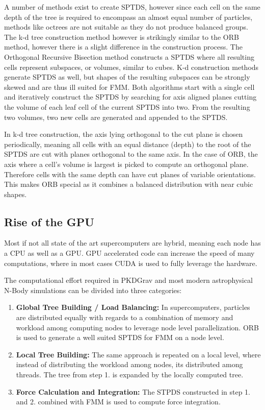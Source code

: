 \documentclass[]{article}
\begin{document}
A number of methods exist to create SPTDS, however since each cell on the same depth of the tree is required to encompass an almost equal number of particles, methods like octrees are not suitable as they do not produce balanced groups. The k-d tree construction method however is strikingly similar to the ORB method, however there is a slight difference in the construction process. 
The Orthogonal Recursive Bisection method constructs a SPTDS where all resulting cells represent subspaces, or volumes, similar to cubes. K-d construction methods generate SPTDS as well, but shapes of the resulting subspaces can be strongly skewed and are thus ill suited for FMM. Both algorithms start with a single cell and iteratively construct the SPTDS by searching for axis aligned planes cutting the volume of each leaf cell of the current SPTDS into two. From the resulting two volumes, two new cells are generated and appended to the SPTDS. 

In k-d tree construction, the axis lying orthogonal to the cut plane is chosen periodically, meaning all cells with an equal distance (depth) to the root of the SPTDS are cut with planes orthogonal to the same axis. In the case of ORB, the axis where a cell's volume is largest is picked to compute an orthogonal plane. Therefore cells with the same depth can have cut planes of variable orientations. This makes ORB special as it combines a balanced distribution with near cubic shapes.  

\subsection{Rise of the GPU}

Most if not all state of the art supercomputers are hybrid, meaning each node has a CPU as well as a GPU\cite{TOP500}. GPU accelerated code can increase the speed of many computations, where in most cases CUDA is used to fully leverage the hardware. 

The computational effort required in PKDGrav and most modern astrophysical N-Body simulations can be divided into three categories:

\begin{enumerate}
	\item \textbf{Global Tree Building / Load Balancing:} In supercomputers, particles are distributed equally with regards to a combination of memory and workload among computing nodes to leverage node level parallelization. ORB is used to generate a well suited SPTDS for FMM on a node level.
	\item \textbf{Local Tree Building:} The same approach is repeated on a local level, where instead of distributing the workload among nodes, its distributed among threads. The tree from step 1. is expanded by the locally computed tree.
	\item \textbf{Force Calculation and Integration:} The STPDS constructed in step 1. and 2. combined with FMM is used to compute force integration. 
\end{enumerate}
\end{document}
